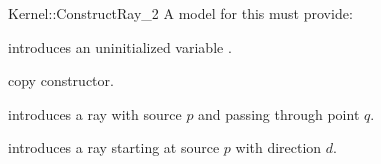 \begin{ccRefFunctionObjectConcept}{Kernel::ConstructRay_2}
A model for this must provide:



\ccHidden {}
             {introduces an uninitialized variable .}

\ccHidden {}
            {copy constructor.}

            {introduces a ray  
             with source $p$ and passing through point $q$.}

            {introduces a ray  starting at source $p$ with 
             direction $d$.}

\ccSeeAlso
{}\\

\end{ccRefFunctionObjectConcept}
